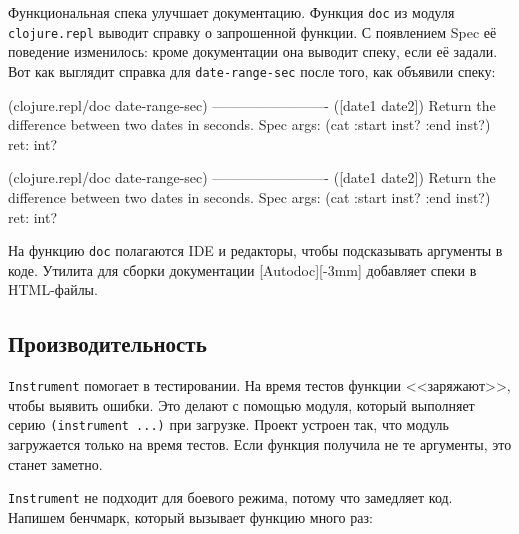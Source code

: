 
Функциональная спека улучшает документацию. Функция \verb|doc| из модуля
\verb|clojure.repl| выводит справку о запрошенной функции. С появлением Spec
её поведение изменилось: кроме документации она выводит спеку, если её
задали. Вот как выглядит справка для \verb|date-range-sec| после того, как
объявили спеку:

\ifx\DEVICETYPE\MOBILE

\begin{english}
  \begin{clojure}
(clojure.repl/doc date-range-sec)
-------------------------
([date1 date2])
  Return the difference
            between two dates in seconds.
Spec
  args: (cat :start inst? :end inst?)
  ret: int?
  \end{clojure}
\end{english}

\else

\begin{english}
  \begin{clojure}
(clojure.repl/doc date-range-sec)
-------------------------
([date1 date2])
  Return the difference between two dates in seconds.
Spec
  args: (cat :start inst? :end inst?)
  ret: int?
  \end{clojure}
\end{english}

\fi


На функцию \verb|doc| полагаются IDE и редакторы, чтобы подсказывать аргументы
в коде. Утилита для сборки документации [Autodoc][-3mm]
добавляет спеки в HTML-файлы.

\subsection{Производительность}


\verb|Instrument| помогает в тестировании. На время тестов функции
<<заряжают>>, чтобы выявить ошибки. Это делают с помощью модуля, который
выполняет серию \verb|(instrument ...)| при загрузке. Проект устроен так, что
модуль загружается только на время тестов. Если функция получила не те
аргументы, это станет заметно.


\verb|Instrument| не подходит для боевого режима, потому что замедляет
код. Напишем бенчмарк, который вызывает функцию много раз:

